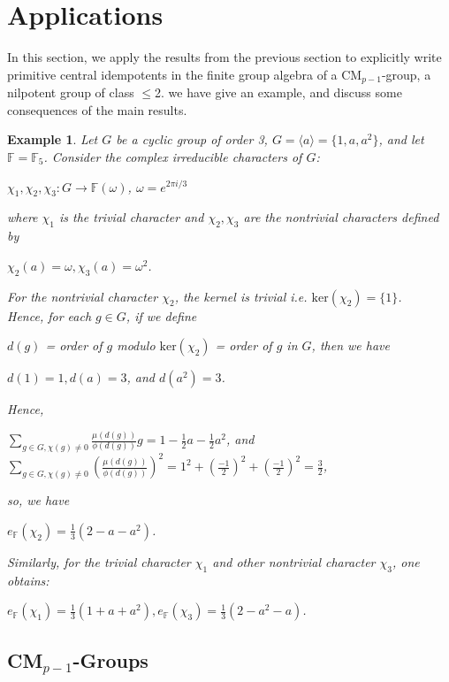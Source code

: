 \documentclass[12pt, reqno]{amsart}
\numberwithin{equation}{section}
\theoremstyle{definition}
\theoremstyle{remark}
\theoremstyle{plain}
\newtheorem{example}{Example}[section]
\begin{document}
\section{Applications}
In this section, we apply the results from the previous section to explicitly write primitive central idempotents in the finite group algebra of a CM$_{p-1}$-group, a nilpotent group of class $\leq$2. we have give an example, and discuss some consequences of the main results.
\begin{example}
  Let $G$ be a cyclic group of order 3, $G=\langle a\rangle=\{1,a,a^2\}$, and let $\mathbb{F}=\mathbb{F}_{5}$. Consider the complex irreducible characters of $G$:
\begin{center}
  $\chi_{1},\chi_{2},\chi_{3}:G\rightarrow\mathbb{F}(\omega)$, $\omega=e^{2\pi i/3}$
\end{center}  
 where $\chi_{1}$ is the trivial character and $\chi_{2},\chi_{3}$ are the nontrivial characters defined by
 \begin{center}
   $\chi_{2}(a)=\omega, \chi_{3}(a)=\omega^2$.
 \end{center}
 For the nontrivial character $\chi_{2}$, the kernel is trivial i.e. $\text{ker}(\chi_{2})=\{1\}$.\\
 Hence, for each $g\in G$, if we define
 \begin{center}
 $d(g)$ = order of $g$ modulo $\text{ker}(\chi_{2})$ = order of $g$ in $G$, then we have
 \end{center} 
 \begin{center}
   $d(1)=1, d(a)=3$, and $d(a^2)=3$.
 \end{center}
 Hence,
 \begin{center}
 $\sum_{g\in G, \chi(g)\neq 0}\frac{\mu(d(g))}{\phi(d(g))}g = 1-\frac{1}{2}a-\frac{1}{2}a^2$, and $\sum_{g\in G, \chi(g)\neq 0}(\frac{\mu(d(g))}{\phi(d(g))})^2= 1^2+(\frac{-1}{2})^2+(\frac{-1}{2})^2=\frac{3}{2}$,
 \end{center}
 so, we have
 \begin{center}
   $e_{\mathbb{F}}(\chi_{2}) = \frac{1}{3}(2-a-a^2)$.
 \end{center}
 Similarly, for the trivial character $\chi_{1}$ and other nontrivial character $\chi_{3}$, one obtains:
 \begin{center}
   $e_{\mathbb{F}}(\chi_{1}) = \frac{1}{3}(1+a+a^2),  e_{\mathbb{F}}(\chi_{3}) = \frac{1}{3}(2-a^2-a)$. 
 \end{center}
\end{example}
\subsection{CM$_{p-1}$-Groups}\smallskip
\end{document}
